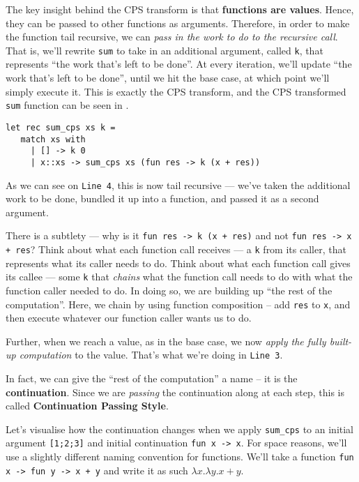 The key insight behind the CPS transform is that \textbf{functions are values}. Hence, they can be passed to other functions as arguments. Therefore, in order to make the function tail recursive, we can \emph{pass in the work to do to the recursive call}. That is, we'll rewrite \texttt{sum} to take in an additional argument, called \texttt{k}, that represents ``the work that's left to be done''. At every iteration, we'll update ``the work that's left to be done'', until we hit the base case, at which point we'll simply execute it. This is exactly the CPS transform, and the CPS transformed \texttt{sum} function can be seen in .

\begin{code}
\label{code:sum-cps-ocaml}
\begin{verbatim}
let rec sum_cps xs k = 
   match xs with
     | [] -> k 0
     | x::xs -> sum_cps xs (fun res -> k (x + res))
\end{verbatim}
\end{code}

As we can see on \texttt{Line 4}, this is now tail recursive --- we've taken the additional work to be done, bundled it up into a function, and passed it as a second argument. 

There is a subtlety --- why is it \texttt{fun res -> k (x + res)} and not \texttt{fun res -> x + res}? Think about what each function call receives --- a \texttt{k} from its caller, that represents what its caller needs to do. Think about what each function call gives its callee --- some \texttt{k} that \emph{chains} what the function call needs to do with what the function caller needed to do. In doing so, we are building up ``the rest of the computation''. Here, we chain by using function composition -- add \texttt{res} to \texttt{x}, and then execute whatever our function caller wants us to do.

Further, when we reach a value, as in the base case, we now \emph{apply the fully built-up computation} to the value. That's what we're doing in \texttt{Line 3}.

In fact, we can give the ``rest of the computation'' a name -- it is the \textbf{continuation}. Since we are \emph{passing} the continuation along at each step, this is called \textbf{Continuation Passing Style}.

Let's visualise how the continuation changes when we apply \texttt{sum\_cps} to an initial argument \texttt{[1;2;3]} and initial continuation \texttt{fun x -> x}. For space reasons, we'll use a slightly different naming convention for functions. We'll take a function \texttt{fun x -> fun y -> x + y} and write it as such $\lambda x. \lambda y. x + y$. 

